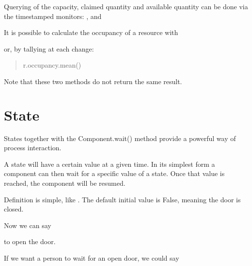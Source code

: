 \documentclass[letterpaper,10pt,english]{sphinxmanual}
\begin{document}
Querying of the capacity, claimed quantity and available quantity can be done via the timestamped monitors:
,  and 

It is possible to calculate the occupancy of a resource with

\begin{sphinxVerbatim}[commandchars=\\\{\}]
    
\end{sphinxVerbatim}

or, by tallying at each change:
\begin{quote}

r.occupancy.mean()
\end{quote}

Note that these two methods do not return the same result.


\chapter{State}
\label{\detokenize{State:state}}\label{\detokenize{State::doc}}
States together with the Component.wait() method provide a powerful way of process interaction.

A state will have a certain value at a given time. In its simplest form a component can then wait for
a specific value of a state. Once that value is reached, the component will be resumed.

Definition is simple, like . The default initial value is False, meaning
the door is closed.

Now we can say

\begin{sphinxVerbatim}[commandchars=\\\{\}]
\end{sphinxVerbatim}

to open the door.

If we want a person to wait for an open door, we could say

\begin{sphinxVerbatim}[commandchars=\\\{\}]
 
\end{sphinxVerbatim}
\end{document}
